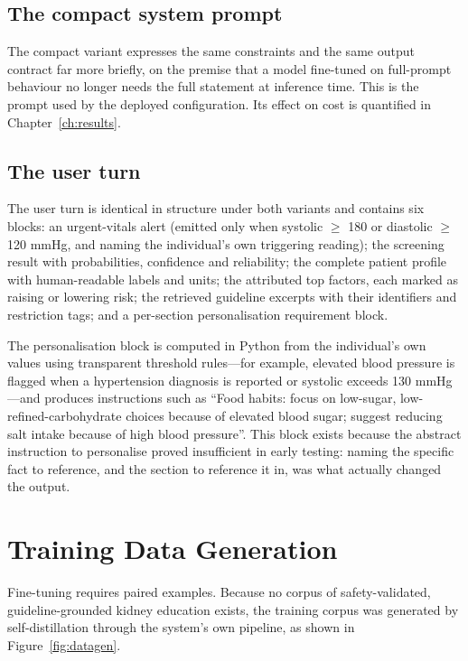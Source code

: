 \subsection{The compact system prompt}

The compact variant expresses the same constraints and the same output contract
far more briefly, on the premise that a model fine-tuned on full-prompt
behaviour no longer needs the full statement at inference time. This is the
prompt used by the deployed configuration. Its effect on cost is quantified in
Chapter~\ref{ch:results}.

\subsection{The user turn}

The user turn is identical in structure under both variants and contains six
blocks: an urgent-vitals alert (emitted only when systolic $\geq$ 180 or
diastolic $\geq$ 120 mmHg, and naming the individual's own triggering reading);
the screening result with probabilities, confidence and reliability; the
complete patient profile with human-readable labels and units; the attributed
top factors, each marked as raising or lowering risk; the retrieved guideline
excerpts with their identifiers and restriction tags; and a per-section
personalisation requirement block.

The personalisation block is computed in Python from the individual's own values
using transparent threshold rules---for example, elevated blood pressure is
flagged when a hypertension diagnosis is reported or systolic exceeds
130 mmHg---and produces instructions such as ``Food habits: focus on low-sugar,
low-refined-carbohydrate choices because of elevated blood sugar; suggest
reducing salt intake because of high blood pressure''. This block exists because
the abstract instruction to personalise proved insufficient in early testing:
naming the specific fact to reference, and the section to reference it in, was
what actually changed the output.

\section{Training Data Generation}
\label{sec:phase7}

Fine-tuning requires paired examples. Because no corpus of safety-validated,
guideline-grounded kidney education exists, the training corpus was generated by
self-distillation through the system's own pipeline, as shown in
Figure~\ref{fig:datagen}.

